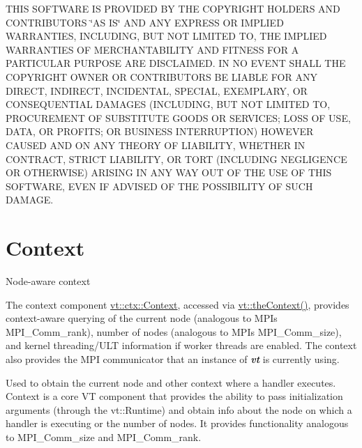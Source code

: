 T\+H\+IS S\+O\+F\+T\+W\+A\+RE IS P\+R\+O\+V\+I\+D\+ED BY T\+HE C\+O\+P\+Y\+R\+I\+G\+HT H\+O\+L\+D\+E\+RS A\+ND C\+O\+N\+T\+R\+I\+B\+U\+T\+O\+RS \char`\"{}\+A\+S I\+S\char`\"{} A\+ND A\+NY E\+X\+P\+R\+E\+SS OR I\+M\+P\+L\+I\+ED W\+A\+R\+R\+A\+N\+T\+I\+ES, I\+N\+C\+L\+U\+D\+I\+NG, B\+UT N\+OT L\+I\+M\+I\+T\+ED TO, T\+HE I\+M\+P\+L\+I\+ED W\+A\+R\+R\+A\+N\+T\+I\+ES OF M\+E\+R\+C\+H\+A\+N\+T\+A\+B\+I\+L\+I\+TY A\+ND F\+I\+T\+N\+E\+SS F\+OR A P\+A\+R\+T\+I\+C\+U\+L\+AR P\+U\+R\+P\+O\+SE A\+RE D\+I\+S\+C\+L\+A\+I\+M\+ED. IN NO E\+V\+E\+NT S\+H\+A\+LL T\+HE C\+O\+P\+Y\+R\+I\+G\+HT O\+W\+N\+ER OR C\+O\+N\+T\+R\+I\+B\+U\+T\+O\+RS BE L\+I\+A\+B\+LE F\+OR A\+NY D\+I\+R\+E\+CT, I\+N\+D\+I\+R\+E\+CT, I\+N\+C\+I\+D\+E\+N\+T\+AL, S\+P\+E\+C\+I\+AL, E\+X\+E\+M\+P\+L\+A\+RY, OR C\+O\+N\+S\+E\+Q\+U\+E\+N\+T\+I\+AL D\+A\+M\+A\+G\+ES (I\+N\+C\+L\+U\+D\+I\+NG, B\+UT N\+OT L\+I\+M\+I\+T\+ED TO, P\+R\+O\+C\+U\+R\+E\+M\+E\+NT OF S\+U\+B\+S\+T\+I\+T\+U\+TE G\+O\+O\+DS OR S\+E\+R\+V\+I\+C\+ES; L\+O\+SS OF U\+SE, D\+A\+TA, OR P\+R\+O\+F\+I\+TS; OR B\+U\+S\+I\+N\+E\+SS I\+N\+T\+E\+R\+R\+U\+P\+T\+I\+ON) H\+O\+W\+E\+V\+ER C\+A\+U\+S\+ED A\+ND ON A\+NY T\+H\+E\+O\+RY OF L\+I\+A\+B\+I\+L\+I\+TY, W\+H\+E\+T\+H\+ER IN C\+O\+N\+T\+R\+A\+CT, S\+T\+R\+I\+CT L\+I\+A\+B\+I\+L\+I\+TY, OR T\+O\+RT (I\+N\+C\+L\+U\+D\+I\+NG N\+E\+G\+L\+I\+G\+E\+N\+CE OR O\+T\+H\+E\+R\+W\+I\+SE) A\+R\+I\+S\+I\+NG IN A\+NY W\+AY O\+UT OF T\+HE U\+SE OF T\+H\+IS S\+O\+F\+T\+W\+A\+RE, E\+V\+EN IF A\+D\+V\+I\+S\+ED OF T\+HE P\+O\+S\+S\+I\+B\+I\+L\+I\+TY OF S\+U\+CH D\+A\+M\+A\+GE. \hypertarget{context}{}\section{Context}\label{context}
Node-\/aware context

The context component {\ttfamily \hyperlink{structvt_1_1ctx_1_1_context}{vt\+::ctx\+::\+Context}}, accessed via {\ttfamily \hyperlink{namespacevt_a26551fe0e6e6a1371111df5b12c7e92c}{vt\+::the\+Context()}}, provides context-\/aware querying of the current node (analogous to M\+PI\textquotesingle{}s {\ttfamily M\+P\+I\+\_\+\+Comm\+\_\+rank}), number of nodes (analogous to M\+PI\textquotesingle{}s {\ttfamily M\+P\+I\+\_\+\+Comm\+\_\+size}), and kernel threading/\+U\+LT information if worker threads are enabled. The context also provides the M\+PI communicator that an instance of {\bfseries {\itshape vt}} is currently using.

Used to obtain the current node and other context where a handler executes. Context is a core VT component that provides the ability to pass initialization arguments (through the {\ttfamily vt\+::\+Runtime}) and obtain info about the node on which a handler is executing or the number of nodes. It provides functionality analogous to {\ttfamily M\+P\+I\+\_\+\+Comm\+\_\+size} and {\ttfamily M\+P\+I\+\_\+\+Comm\+\_\+rank}.

